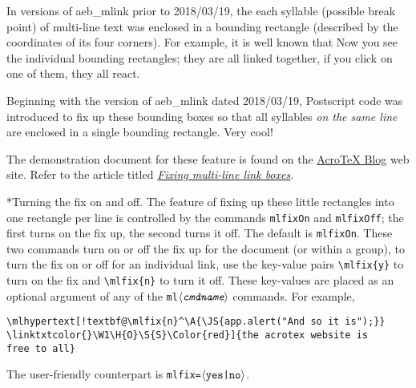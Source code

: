 \documentclass{article}
\makeatletter
\edef\amtIndent{\the\leftmargini}
\def\AcroTeX{Acro\negthinspace\TeX}
\def\anglemeta#1{$\langle\textit{\texttt{#1}}\rangle$}
\let\ameta\anglemeta
\let\pkg\textsf
\def\cs#1{\texttt{\@backslashchar#1}}
\renewcommand{\paragraph}
    {\@startsection{paragraph}{4}{0pt}{6pt}{-3pt}{\bfseries}}
\makeatother
\begin{document}
In versions of \pkg{aeb\_mlink} prior to 2018/03/19, the each syllable
(possible break point) of multi-line text was enclosed in a bounding
rectangle (described by the coordinates of its four corners). For example, it
is well known that  Now you see the individual bounding
rectangles; they are all linked together, if you click on one of them, they
all react.

Beginning with the version of \pkg{aeb\_mlink} dated 2018/03/19, Postscript
code was introduced to fix up these bounding boxes so that all syllables
\emph{on the same line} are enclosed in a single bounding rectangle.
 Very cool!

 The demonstration document for these feature is found on the
\href{\urlAcroTeXBlog}{{\AcroTeX} Blog} web site. Refer to the article
titled \textsl{\href{\urlAcroTeXBlog?p=1377}{Fixing multi-line link boxes}}.


\paragraph*{Turning the fix on and off.} The feature of fixing up these
little rectangles into one rectangle per line is controlled by the commands
\cs{mlfixOn} and \cs{mlfixOff}; the first turns on the fix up, the second
turns it off. The default is \cs{mlfixOn}. These two commands turn on or off
the fix up for the document (or within a group), to turn the fix on or off
for an individual link, use the key-value pairs \verb~\mlfix{y}~ to turn on
the fix and \verb~\mlfix{n}~ to turn it off. These key-values are placed as
an optional argument of any of the \cs{ml\ameta{cmdname}} commands. For
example,
\begin{Verbatim}[xleftmargin=\amtIndent,fontsize=\small,commandchars={!@^}]
\mlhypertext[!textbf@\mlfix{n}^\A{\JS{app.alert("And so it is");}}
\linktxtcolor{}\W1\H{O}\S{S}\Color{red}]{the acrotex website is
free to all}
\end{Verbatim}
The user-friendly counterpart is \texttt{mlfix=\ameta{\upshape{yes|no}}}.
\end{document}
